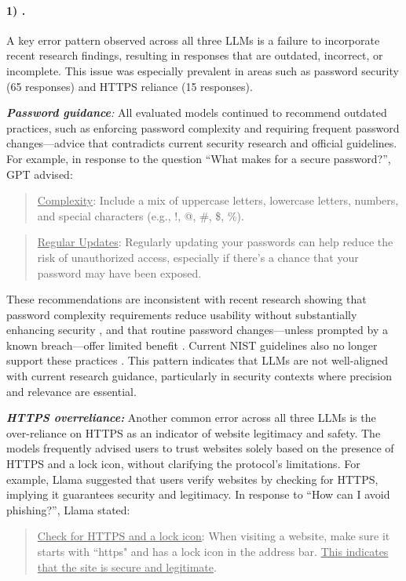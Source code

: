 \paragraph{1) \LackAdherenceResearch.} A key error pattern observed across all three LLMs is a failure to incorporate recent research findings, resulting in responses that are outdated, incorrect, or incomplete. This issue was especially prevalent in areas such as password security (65 responses) and HTTPS reliance (15 responses).

   
    \noindent \textit{\textbf{Password guidance}:} All evaluated models continued to recommend outdated practices, such as enforcing password complexity and requiring frequent password changes—advice that contradicts current security research and official guidelines. For example, in response to the question “What makes for a secure password?”, GPT advised:
            
            \begin{quote}
                \underline{Complexity}: Include a mix of uppercase letters, lowercase letters, numbers, and special characters (e.g., \!!, @, \#, \$, \%).
            \end{quote}
            \begin{quote}    
                \underline{Regular Updates}: Regularly updating your passwords can help reduce the risk of unauthorized access, especially if there's a chance that your password may have been exposed.
            \end{quote}
    
    
    These recommendations are inconsistent with recent research showing that password complexity requirements reduce usability without substantially enhancing security \cite{shay-2016-password-policy}, and that routine password changes—unless prompted by a known breach—offer limited benefit \cite{zhang-2010-password-expiration, chiasson-2015-password-expiration, habib-2018-password-expiration}. Current NIST guidelines also no longer support these practices \cite{grassi-2017-nist-password-guidelines}. This pattern indicates that LLMs are not well-aligned with current research guidance, particularly in security contexts where precision and relevance are essential.
        
    \noindent \textit{\textbf{HTTPS overreliance:}} Another common error across all three LLMs is the over-reliance on HTTPS as an indicator of website legitimacy and safety. The models frequently advised users to trust websites solely based on the presence of HTTPS and a lock icon, without clarifying the protocol’s limitations. For example, Llama suggested that users verify websites by checking for HTTPS, implying it guarantees security and legitimacy. In response to “How can I avoid phishing?”, Llama stated:
        \begin{quote}
            \underline{Check for HTTPS and a lock icon}: When visiting a website, make sure it starts with “https" and has a lock icon in the address bar. \underline{This indicates that the site is secure and legitimate}.
        \end{quote}

